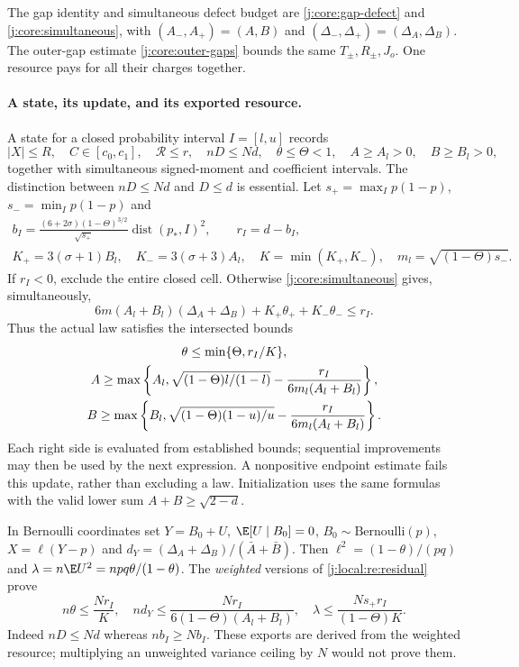 The gap identity and simultaneous defect budget are
\eqref{j:core:gap-defect} and \eqref{j:core:simultaneous}, with
$(A_-,A_+)=(A,B)$ and $(\Delta_-,\Delta_+)=(\Delta_A,\Delta_B)$.
The outer-gap estimate \eqref{j:core:outer-gaps} bounds the same
$T_\pm,R_\pm,J_o$. One resource pays for all their charges together.

\paragraph{A state, its update, and its exported resource.}
A state for a closed probability interval $I=[l,u]$ records
\[
 |X|\le R,\quad C\in[c_0,c_1],\quad\mathcal R\le r,
 \quad nD\le Nd,\quad\theta\le\Theta<1,
 \quad A\ge A_l>0,\quad B\ge B_l>0,
\]
together with simultaneous signed-moment and coefficient intervals.
The distinction between $nD\le Nd$ and $D\le d$ is essential.
Let $s_+=\max_Ip(1-p)$, $s_-=\min_Ip(1-p)$ and
\begin{gather*}
 b_I=\frac{(6+2\sigma)(1-\Theta)^{3/2}}{\sqrt{s_+}}
                 \operatorname{dist}(p_*,I)^2,
 \qquad r_I=d-b_I,\\
 K_+=3(\sigma+1)B_l,\quad K_-=3(\sigma+3)A_l,
 \quad K=\min(K_+,K_-),\quad m_l=\sqrt{(1-\Theta)s_-}.
\end{gather*}
If $r_I<0$, exclude the entire closed cell. Otherwise \eqref{j:core:simultaneous}
gives, simultaneously,
\begin{equation}\label{j:local:re:residual}
 6m(A_l+B_l)(\Delta_A+\Delta_B)+K_+\theta_++K_-\theta_-\le r_I.
\end{equation}
Thus the actual law satisfies the intersected bounds
\begin{gather}
 \theta\le\min\{\Theta,r_I/K\},\notag\\
 A\ge\max\left\{A_l,\sqrt{(1-\Theta)l/(1-l)}-
                  \frac{r_I}{6m_l(A_l+B_l)}\right\},\notag\\
 B\ge\max\left\{B_l,\sqrt{(1-\Theta)(1-u)/u}-
                  \frac{r_I}{6m_l(A_l+B_l)}\right\}.\label{j:local:re:geometry}
\end{gather}
Each right side is evaluated from established bounds; sequential
improvements may then be used by the next expression. A nonpositive
endpoint estimate fails this update, rather than excluding a law.
Initialization uses the same formulas with the valid lower sum
$A+B\ge\sqrt{2-d}$.

In Bernoulli coordinates set $Y=B_0+U$, $\E[U\mid B_0]=0$,
$B_0\sim\mathrm{Bernoulli}(p)$, $X=\ell(Y-p)$ and
$d_Y=(\Delta_A+\Delta_B)/(\bar A+\bar B)$.
Then $\ell^2=(1-\theta)/(pq)$ and $\lambda=n\E U^2=npq\theta/(1-\theta)$.
The \emph{weighted} versions of \eqref{j:local:re:residual} prove
\begin{equation}\label{j:local:re:exports}
 n\theta\le\frac{Nr_I}{K},\quad
 nd_Y\le\frac{Nr_I}{6(1-\Theta)(A_l+B_l)},\quad
 \lambda\le\frac{Ns_+r_I}{(1-\Theta)K}.
\end{equation}
Indeed $nD\le Nd$ whereas $nb_I\ge Nb_I$.
These exports are derived from the weighted resource; multiplying an
unweighted variance ceiling by $N$ would not prove them.


